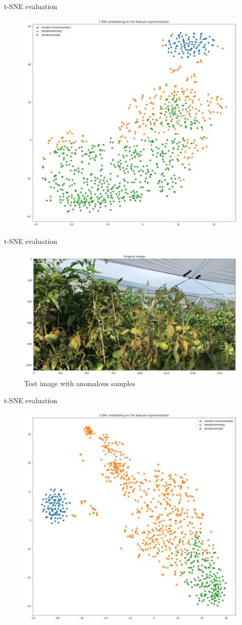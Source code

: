 \documentclass[15pt]{beamer} %
\begin{document}
\begin{frame}{t-SNE evaluation}
 \begin{figure}
  \centering
  \includegraphics[width=.6\textwidth]{anogan_t_sne1}
 \end{figure}
\end{frame}

\begin{frame}{t-SNE evaluation}
 \begin{figure}
  \centering
  \includegraphics[width=.85\textwidth]{anogan_test_image2}
  \caption{Test image with anomalous samples}
 \end{figure}
\end{frame}

\begin{frame}{t-SNE evaluation}
 \begin{figure}
  \centering
  \includegraphics[width=.6\textwidth]{anogan_t_sne2}
 \end{figure}
\end{frame}
\end{document}

